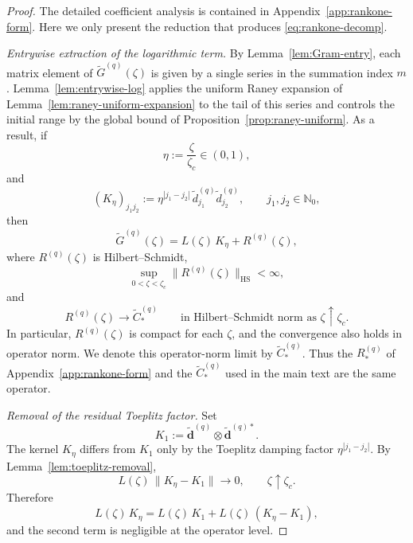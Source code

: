 \documentclass[11pt]{amsart}
\numberwithin{equation}{section}
\theoremstyle{plain}
\theoremstyle{definition}
\theoremstyle{remark}
\newcommand{\NN}{\mathbb{N}}
\begin{document}
\begin{proof}
	The detailed coefficient analysis is contained in
	Appendix~\ref{app:rankone-form}. Here we only present the reduction that
	produces \eqref{eq:rankone-decomp}.

	\smallskip
	\noindent\emph{Entrywise extraction of the logarithmic term.}
	By Lemma~\ref{lem:Gram-entry}, each matrix element of
	\(\widetilde G^{(q)}(\zeta)\) is given by a single series in the summation
	index \(m\). Lemma~\ref{lem:entrywise-log} applies the uniform Raney
	expansion of Lemma~\ref{lem:raney-uniform-expansion} to the tail of this
	series and controls the initial range by the global bound of
	Proposition~\ref{prop:raney-uniform}. As a result, if
	\[
		\eta:=\frac{\zeta}{\zeta_c}\in(0,1),
	\]
	and
	\[
		(K_\eta)_{j_1j_2}
		:=
		\eta^{|j_1-j_2|}\,
		\widetilde d^{(q)}_{j_1}\widetilde d^{(q)}_{j_2},
		\qquad
		j_1,j_2\in\NN_0,
	\]
	then
	\begin{equation}\label{eq:rankone-preliminary}
		\widetilde G^{(q)}(\zeta)
		=
		L(\zeta)\,K_\eta
		+
		R^{(q)}(\zeta),
	\end{equation}
	where \(R^{(q)}(\zeta)\) is Hilbert--Schmidt,
	\[
		\sup_{0<\zeta<\zeta_c}\|R^{(q)}(\zeta)\|_{\mathrm{HS}}<\infty,
	\]
	and
	\[
		R^{(q)}(\zeta)\to \widetilde C_*^{(q)}
		\qquad\text{in Hilbert--Schmidt norm as }\zeta\uparrow\zeta_c.
	\]
	In particular, \(R^{(q)}(\zeta)\) is compact for each \(\zeta\), and the
	convergence also holds in operator norm. We denote this operator-norm
	limit by \(\widetilde C_*^{(q)}\). Thus the \(R_*^{(q)}\) of
	Appendix~\ref{app:rankone-form} and the \(\widetilde C_*^{(q)}\) used in
	the main text are the same operator.

	\smallskip
	\noindent\emph{Removal of the residual Toeplitz factor.}
	Set
	\[
		K_1:=\widetilde{\bm d}^{(q)}\otimes \widetilde{\bm d}^{(q)*}.
	\]
	The kernel \(K_\eta\) differs from \(K_1\) only by the Toeplitz damping factor
	\(\eta^{|j_1-j_2|}\). By Lemma~\ref{lem:toeplitz-removal},
	\begin{equation}\label{eq:toeplitz-removal-proof}
		L(\zeta)\,\|K_\eta-K_1\|\longrightarrow0,
		\qquad \zeta\uparrow\zeta_c.
	\end{equation}
	Therefore
	\[
		L(\zeta)\,K_\eta
		=
		L(\zeta)\,K_1
		+
		L(\zeta)\,(K_\eta-K_1),
	\]
	and the second term is negligible at the operator level.


\end{proof}
\end{document}
